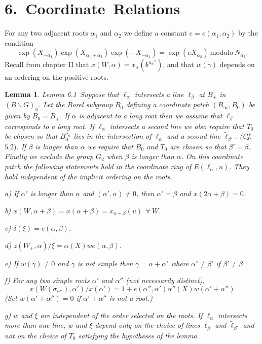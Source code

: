 \documentclass{memo-l}
\newtheorem{lemma}[theorem]{Lemma}
\theoremstyle{definition}
\theoremstyle{remark}
\numberwithin{section}{chapter}
\numberwithin{equation}{chapter}
\begin{document}
\section{6.\  Coordinate\ Relations}


   For any two adjacent roots ${\alpha}_{1}$ and ${\alpha}_{2}$ we define a
constant $e = e({\alpha}_{1},{\alpha}_{2})$ by the condition
$$
\exp(X_{-{\alpha}_{1}})\exp(X_{{\alpha}_{1}+{\alpha}_{2}}) 
\exp(-X_{-{\alpha}_{1}}) = \exp(eX_{{\alpha}_{2}})\ {\text{modulo}}\
N_{{\alpha}_{2}}.
$$
Recall from chapter II that $x(W,{\alpha}) = x_{{\alpha}}(b^{n_{w}^{-1}})$, 
and that $w({\gamma})$ depends on an ordering on the
positive roots.
 
\medpagebreak

\begin{lemma}{Lemma 6.1}\ Suppose that ${\ell}_{{\alpha}}$ intersects a
line ${\ell}_{{\beta}}$ at $B_{+}$ in $(B\backslash G)_{u}$.  Let the Borel
subgroup $B_{0}$ defining a coordinate patch $(B_{{\infty}},B_{0})$ be
given by $B_{0} = B_{+}$.  If ${\alpha}$ is adjacent to a long root then we
assume that ${\ell}_{{\beta}}$ corresponds to a long root.  If
${\ell}_{{\alpha}}$ intersects a second line we also require that $T_{0}$
be chosen so that $B_{0}^{{\sigma}_{{\alpha}}}$ lies in the
intersection of ${\ell}_{{\alpha}}$ and a second line $\tilde{\ell}
_{{\beta}'}$.  (Cf.  $5.2)$.  If ${\beta}$ is longer than ${\alpha}$ we
require that $B_{0}$ and $T_{0}$ are chosen so that ${\beta}'={\beta}$.
Finally we exclude the group $G_{2}$ when ${\beta}$ is longer than
${\alpha}$.  On this coordinate patch the following statements hold in the
coordinate ring of $E({\ell}_{{\alpha}},u)$.  They hold independent of
the implicit ordering on the roots.

\smallskip 
a) If ${\alpha}'$ is longer than ${\alpha}$ and $({\alpha}',{\alpha}) \ne
0$, then ${\alpha}' = {\beta}$ and $x(2{\alpha}+{\beta}) = 0$.


b) $x(W,{\alpha}+{\beta}) = x({\alpha}+{\beta}) = x_{{\alpha}+{\beta}}(u)\
{\ \forall\ } W$.


c) ${\delta}({\xi}) = e({\alpha},{\beta})$.


d) $z(W_{+},{\alpha})/{\xi} = {\alpha}(X)we({\alpha},{\beta})$.

e) If $w({\gamma})\ne 0$ and ${\gamma}$ is not simple then
${\gamma} = {\alpha}+{\alpha}'$ where ${\alpha}' \ne {\beta}'$ if ${\beta}' \ne
{\beta}$.

      
f) For any two simple roots ${\alpha}'$ and ${\alpha}''$ (not necessarily
distinct), $$x(W({\sigma}_{{\alpha}''}),{\alpha}')/x({\alpha}') =
1+e({\alpha''},{\alpha}'){\alpha}''(X)w({\alpha}'+{\alpha}'')$$ (Set
$w({\alpha}'+{\alpha}'') = 0$ if ${\alpha}'+{\alpha}''$ is not a root.)

        
g) $w$ and ${\xi}$ are independent of the order selected on the roots.  If
${\ell}_{{\alpha}}$ intersects more than one line, $w$ and ${\xi}$ depend
only on the choice of lines ${\ell}_{{\beta}}$ and $\tilde{\ell}
_{{\beta}'}$ and not on the choice of $T_{0}$ satisfying the hypotheses of
the lemma.
\end{lemma}
\end{document}
